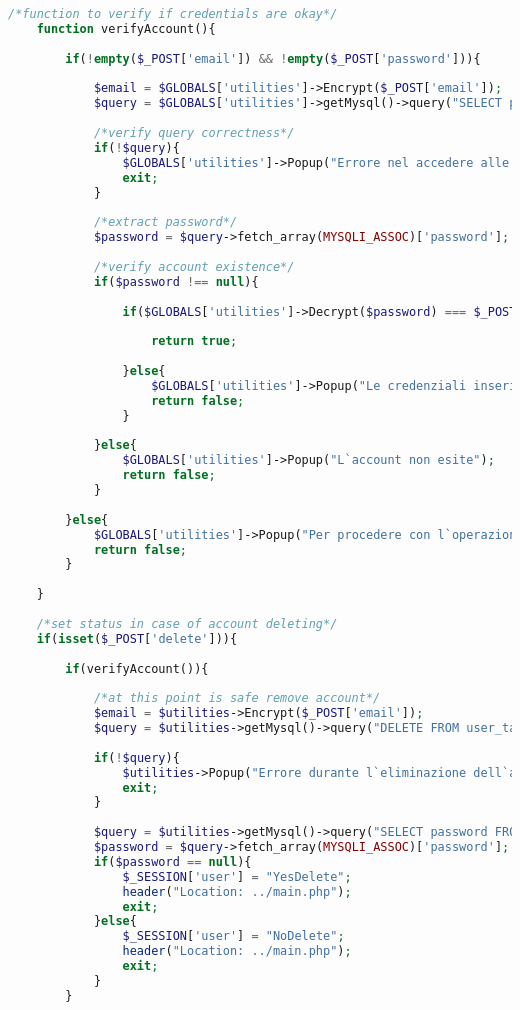 \begin{lstlisting}[language=php]
	/*function to verify if credentials are okay*/
	function verifyAccount(){
		
		if(!empty($_POST['email']) && !empty($_POST['password'])){
			
			$email = $GLOBALS['utilities']->Encrypt($_POST['email']);
			$query = $GLOBALS['utilities']->getMysql()->query("SELECT password FROM user_table1 WHERE (email = '{$email}')");
			
			/*verify query correctness*/
			if(!$query){
				$GLOBALS['utilities']->Popup("Errore nel accedere alle informazioni");
				exit;
			}
			
			/*extract password*/
			$password = $query->fetch_array(MYSQLI_ASSOC)['password'];
			
			/*verify account existence*/
			if($password !== null){
				
				if($GLOBALS['utilities']->Decrypt($password) === $_POST['password']){
					
					return true;
					
				}else{
					$GLOBALS['utilities']->Popup("Le credenziali inserite non sono corrette");
					return false;
				}
				
			}else{
				$GLOBALS['utilities']->Popup("L`account non esite");
				return false;
			}
			
		}else{
			$GLOBALS['utilities']->Popup("Per procedere con l`operazione i campi devono essere tutti riempiti");
			return false;
		}
		
	}
	
	/*set status in case of account deleting*/
	if(isset($_POST['delete'])){
		
		if(verifyAccount()){
			
			/*at this point is safe remove account*/
			$email = $utilities->Encrypt($_POST['email']);
			$query = $utilities->getMysql()->query("DELETE FROM user_table1 WHERE (email = '{$email}')");
			
			if(!$query){
				$utilities->Popup("Errore durante l`eliminazione dell`account");
				exit;
			}
			
			$query = $utilities->getMysql()->query("SELECT password FROM user_table1 WHERE (email = '{$email}')");
			$password = $query->fetch_array(MYSQLI_ASSOC)['password'];
			if($password == null){
				$_SESSION['user'] = "YesDelete";
				header("Location: ../main.php");
				exit;
			}else{
				$_SESSION['user'] = "NoDelete";
				header("Location: ../main.php");
				exit;
			}
		}
		

\end{lstlisting}
